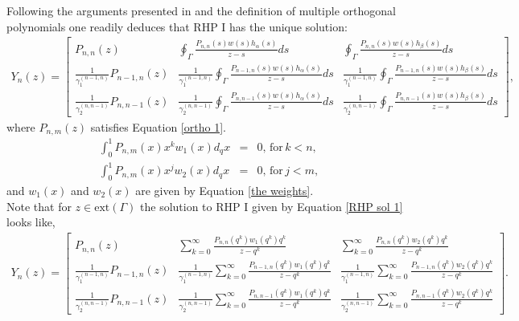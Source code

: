 \documentclass[a4paper,reqno]{amsart}
\numberwithin{equation}{section}
\numberwithin{figure}{section}
\begin{document}
Following the arguments presented in \cite{qRHP} and the definition of multiple orthogonal polynomials one readily deduces that RHP I has the unique solution:
\begin{gather} \label{RHP sol 1}
Y_n(z) 
=
\begin{bmatrix}
   P_{n,n}(z) &
   \oint_\Gamma \frac{P_{n,n}(s)w(s)h_\alpha(s)}{z-s} ds&
   \oint_\Gamma \frac{P_{n,n}(s)w(s)h_\beta(s)}{z-s} ds \\
   \frac{1}{\gamma_1^{(n-1,n)}}P_{n-1,n}(z)&
    \frac{1}{\gamma_1^{(n-1,n)}}\oint_\Gamma \frac{P_{n-1,n}(s)w(s)h_\alpha(s)}{z-s} ds &
    \frac{1}{\gamma_1^{(n-1,n)}}\oint_\Gamma \frac{P_{n-1,n}(s)w(s)h_\beta(s)}{z-s} ds\\
    \frac{1}{\gamma_2^{(n,n-1)}}P_{n,n-1}(z) &
    \frac{1}{\gamma_2^{(n,n-1)}}\oint_\Gamma \frac{P_{n,n-1}(s)w(s)h_\alpha(s)}{z-s} ds&
    \frac{1}{\gamma_2^{(n,n-1)}}\oint_\Gamma \frac{P_{n,n-1}(s)w(s)h_\beta(s)}{z-s} ds
   \end{bmatrix},
\end{gather}
where $P_{n,m}(z)$ satisfies Equation \eqref{ortho 1}. 
\begin{subequations}\label{ortho 1}
\begin{eqnarray}
\int_{0}^1 P_{n,m}(x)x^kw_{1}(x) d_qx &=& 0,\,\mathrm{for}\,k<n ,\\
\int_{0}^1 P_{n,m}(x)x^jw_{2}(x) d_qx &=& 0,\,\mathrm{for}\,j<m ,
\end{eqnarray}
\end{subequations}
and $w_1(x)$ and $w_2(x)$ are given by Equation \eqref{the weights}. \\

Note that for $z\in\text{ext}(\Gamma)$ the solution to RHP I given by Equation \eqref{RHP sol 1} looks like,
\begin{gather} \label{RHP sol 2}
Y_n(z) 
=
\begin{bmatrix}
   P_{n,n}(z) &
   \sum_{k=0}^\infty \frac{P_{n,n}(q^k)w_1(q^k)q^k}{z-q^k} &
   \sum_{k=0}^\infty \frac{P_{n,n}(q^k)w_2(q^k)q^k}{z-q^k} \\
   \frac{1}{\gamma_1^{(n-1,n)}}P_{n-1,n}(z)&
    \frac{1}{\gamma_1^{(n-1,n)}}\sum_{k=0}^\infty \frac{P_{n-1,n}(q^k)w_1(q^k)q^k}{z-q^k} &
    \frac{1}{\gamma_1^{(n-1,n)}}\sum_{k=0}^\infty \frac{P_{n-1,n}(q^k)w_2(q^k)q^k}{z-q^k}\\
    \frac{1}{\gamma_2^{(n,n-1)}}P_{n,n-1}(z) &
    \frac{1}{\gamma_2^{(n,n-1)}}\sum_{k=0}^\infty \frac{P_{n,n-1}(q^k)w_1(q^k)q^k}{z-q^k}&
    \frac{1}{\gamma_2^{(n,n-1)}}\sum_{k=0}^\infty \frac{P_{n,n-1}(q^k)w_2(q^k)q^k}{z-q^k}
   \end{bmatrix}.
\end{gather}
\end{document}

